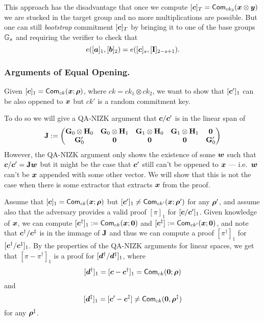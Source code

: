 This approach has the disadvantage that once we compute $[{\boldsymbol{c}}]_T=\mathsf{Com}_{ck_3}({\boldsymbol{x}}\otimes{\boldsymbol{y}})$ we are stucked in the target group and no more multiplications are possible. But one can still \emph{bootstrap} commitment $[{\boldsymbol{c}}]_T$  by bringing it to one of the base groups $\mathbb{G}_s$ and requiring the verifier to check that
$$
e([{\boldsymbol{a}}]_1,[{\boldsymbol{b}}]_2)=e([{\boldsymbol{c}}]_s,[\mathbf{{I}}]_{2-s+1}).
$$
%
%

\subsubsection{Arguments of Equal Opening.} Given $[{\boldsymbol{c}}]_1=\mathsf{Com}_{ck}({\boldsymbol{x}};{\boldsymbol{\rho}})$, where $ck = ck_1\otimes ck_2$, we want to show that $[{\boldsymbol{c}}']_1$ can be also oppened to ${\boldsymbol{x}}$ but $ck'$ is a random commitment key.

To do so we will give a QA-NIZK argument that ${\boldsymbol{c}}/{\boldsymbol{c}}'$ is in the linear span of
$$
\mathbf{{J}}:=
\begin{pmatrix}
\mathbf{{G}}_0\otimes\mathbf{{H}}_0 & \mathbf{{G}}_0\otimes\mathbf{{H}}_1 & \mathbf{{G}}_1\otimes\mathbf{{H}}_0& \mathbf{{G}}_1\otimes\mathbf{{H}}_1 & \mathbf{{0}}\\
\mathbf{{G}}'_0 & \mathbf{{0}} & \mathbf{{0}} & \mathbf{{0}} & \mathbf{{G}}'_0 
\end{pmatrix}
$$
However, the QA-NIZK argument only shows the existence of some ${\boldsymbol{w}}$ such that ${\boldsymbol{c}}/{\boldsymbol{c}}' = \mathbf{{J}}{\boldsymbol{w}}$ but it might be the case that ${\boldsymbol{c}}'$ still can't be oppened to ${\boldsymbol{x}}$ --- i.e.~${\boldsymbol{w}}$ can't be ${\boldsymbol{x}}$ appended with some other vector. We will show that this is not the case when there is some extractor that extracts ${\boldsymbol{x}}$ from the proof.

Assume that $[{\boldsymbol{c}}]_1 = \mathsf{Com}_{ck}({\boldsymbol{x}};{\boldsymbol{\rho}})$ but $[{\boldsymbol{c}}']_1\neq \mathsf{Com}_{ck'}({\boldsymbol{x}};{\boldsymbol{\rho}}')$ for any ${\boldsymbol{\rho}}'$, and assume also that the adversary provides a valid proof $[\pi]_1$ for $[{\boldsymbol{c}}/{\boldsymbol{c}}']_1$. Given knowledge of ${\boldsymbol{x}}$, we can compute $[{\boldsymbol{c}}^\dag]_1:=\mathsf{Com}_{ck}({\boldsymbol{x}};{\boldsymbol{0}})$ and $[{\boldsymbol{c}}^\ddag]:=\mathsf{Com}_{ck'}({\boldsymbol{x}};{\boldsymbol{0}})$, and note that ${\boldsymbol{c}}^\dag/{\boldsymbol{c}}^\ddag$ is in the immage of $\mathbf{{J}}$ and thus we can compute a proof $[\pi^\dag]_1$ for $[{\boldsymbol{c}}^\dag/{\boldsymbol{c}}^\ddag]_1$. By the properties of the QA-NIZK arguments for linear spaces, we get that $[\pi-\pi^\dag]_1$ is a proof for $[{\boldsymbol{d}}^\dag/{\boldsymbol{d}}^\ddag]_1$, where
$$[{\boldsymbol{d}}^\dag]_1=[{\boldsymbol{c}}-{\boldsymbol{c}}^\dag]_1= \mathsf{Com}_{ck}({\boldsymbol{0}};{\boldsymbol{\rho}})$$ and 
$$[{\boldsymbol{d}}^\ddag]_1 = [{\boldsymbol{c}}'-{\boldsymbol{c}}^\ddag]\neq\mathsf{Com}_{ck}({\boldsymbol{0}},{\boldsymbol{\rho}}^\ddag)$$ for any ${\boldsymbol{\rho}}^\ddag$.

